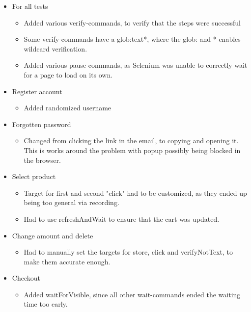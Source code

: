 \documentclass[UKenglish,12pt]{article}
\begin{document}
\begin{itemize}
	\item For all tests
	\begin{itemize}
		\item Added various verify-commands, to verify that the steps were successful
		\item Some verify-commands have a glob:text*, where the glob: and * enables wildcard verification.
		\item Added various pause commands, as Selenium was unable to correctly wait for a page to load on its own.
	\end{itemize}
	\item Register account
	\begin{itemize}
		\item Added randomized username
	\end{itemize}
	\item Forgotten password
	\begin{itemize}
		\item Changed from clicking the link in the email, to copying and opening it. This is works around the problem with popup possibly being blocked in the browser.
	\end{itemize}
	\item Select product
	\begin{itemize}
		\item Target for first and second "click" had to be customized, as they ended up being too general via recording.
		\item Had to use refreshAndWait to ensure that the cart was updated.
	\end{itemize}
	\item Change amount and delete
	\begin{itemize}
		\item Had to manually set the targets for store, click and verifyNotText, to make them accurate enough.
	\end{itemize}
	\item Checkout
	\begin{itemize}
		\item Added waitForVisible, since all other wait-commands ended the waiting time too early.
	\end{itemize}
\end{itemize}
\end{document}
